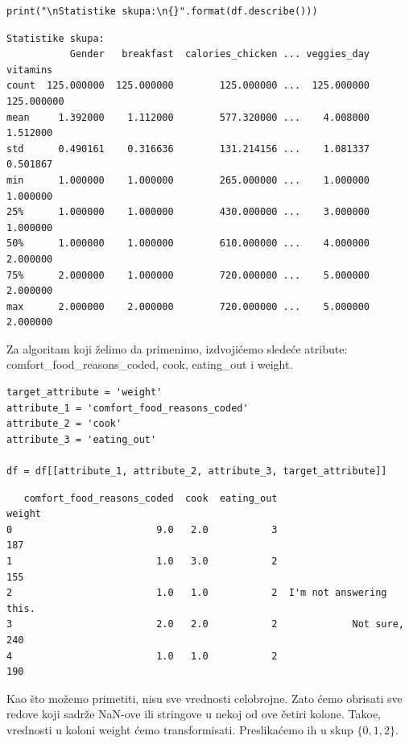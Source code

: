 \documentclass[12pt,a4paper]{article}
\begin{document}
\begin{lstlisting}[mathescape=true]
print("\nStatistike skupa:\n{}".format(df.describe()))
\end{lstlisting}

\begin{verbatim}
Statistike skupa:
           Gender   breakfast  calories_chicken ... veggies_day    vitamins
count  125.000000  125.000000        125.000000 ...  125.000000  125.000000
mean     1.392000    1.112000        577.320000 ...    4.008000    1.512000
std      0.490161    0.316636        131.214156 ...    1.081337    0.501867
min      1.000000    1.000000        265.000000 ...    1.000000    1.000000
25%      1.000000    1.000000        430.000000 ...    3.000000    1.000000
50%      1.000000    1.000000        610.000000 ...    4.000000    2.000000
75%      2.000000    1.000000        720.000000 ...    5.000000    2.000000
max      2.000000    2.000000        720.000000 ...    5.000000    2.000000
\end{verbatim}

Za algoritam koji \v zelimo da primenimo, izdvoji\' cemo slede\' ce atribute: comfort\_food\_reasons\_coded, cook, eating\_out i weight.

\begin{lstlisting}[mathescape=true]
target_attribute = 'weight'
attribute_1 = 'comfort_food_reasons_coded'
attribute_2 = 'cook'
attribute_3 = 'eating_out'

df = df[[attribute_1, attribute_2, attribute_3, target_attribute]]
\end{lstlisting}

\begin{verbatim}
   comfort_food_reasons_coded  cook  eating_out                    weight
0                         9.0   2.0           3                       187
1                         1.0   3.0           2                       155
2                         1.0   1.0           2  I'm not answering this.
3                         2.0   2.0           2             Not sure, 240
4                         1.0   1.0           2                       190
\end{verbatim}

Kao \v sto mo\v zemo primetiti, nisu sve vrednosti celobrojne. Zato \' cemo obrisati sve redove koji sadr\v ze NaN-ove ili stringove u nekoj od ove \v cetiri kolone. Tako\dj e, vrednosti u koloni weight \' cemo transformisati. Preslika\' cemo ih u skup $\{0, 1, 2\}$.
\end{document}
